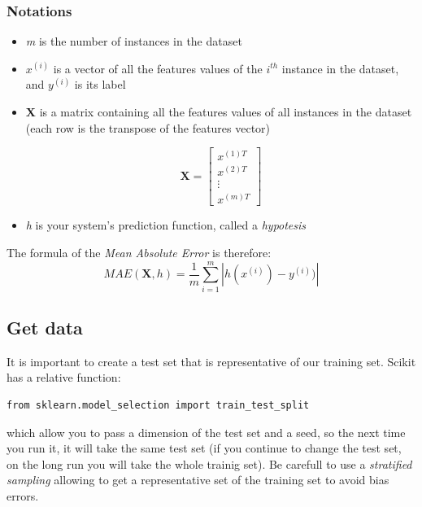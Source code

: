 \documentclass{article}
\begin{document}
\subsubsection{Notations}
\begin{itemize}
\item{\textit{m} is the number of instances in the dataset}
\item{$ x^{(i)} $ is a vector of all the features values of the $i^{th}$ instance in the dataset, and $y^{(i)}$ is its label}

\item{\textbf{X} is a matrix containing all the features values of all instances in the dataset (each row is the transpose of the features vector)

$$
   \textbf{X}  = \begin{bmatrix}
             x^{(1)T} \\
             x^{(2)T}\\
             \vdots \\
             x^{(m)T}
         \end{bmatrix}
$$
}
\item{ \textit{h} is your system's prediction function, called a \textit{hypotesis}}

\end{itemize}

The formula of the \textit{Mean Absolute Error} is therefore:
$$MAE(\textbf{X},h) = \frac{1}{m} \displaystyle\sum_{i=1}^{m}  | h(x^{(i)})- y^{(i)})| $$


\subsection{Get data}
It is important to create a test set that is representative of our training set.
Scikit has a relative function:
\begin{lstlisting}
from sklearn.model_selection import train_test_split
\end{lstlisting}
which allow you to pass a dimension of the test set and a seed, so the next time you run it, it will take the same test set (if you continue to change the test set, on the long run you will take the whole trainig set). Be carefull to use a \textit{stratified sampling} allowing to get a representative set of the training set to avoid bias errors.
\end{document}
